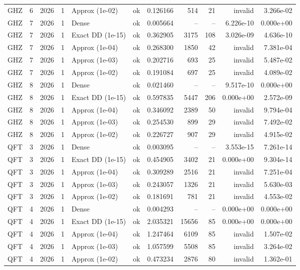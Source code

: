 \begin{tabular}{lrrrllrrrrr}
GHZ & 6 & 2026 & 1 & Approx (1e-02) & ok & 0.126166 & 514 & 21 & invalid & 3.266e-02 \\
GHZ & 7 & 2026 & 1 & Dense & ok & 0.005664 & -- & -- & 6.226e-10 & 0.000e+00 \\
GHZ & 7 & 2026 & 1 & Exact DD (1e-15) & ok & 0.362905 & 3175 & 108 & 3.026e-09 & 4.636e-10 \\
GHZ & 7 & 2026 & 1 & Approx (1e-04) & ok & 0.268300 & 1850 & 42 & invalid & 7.381e-04 \\
GHZ & 7 & 2026 & 1 & Approx (1e-03) & ok & 0.202716 & 693 & 25 & invalid & 5.487e-02 \\
GHZ & 7 & 2026 & 1 & Approx (1e-02) & ok & 0.191084 & 697 & 25 & invalid & 4.089e-02 \\
GHZ & 8 & 2026 & 1 & Dense & ok & 0.021460 & -- & -- & 9.517e-10 & 0.000e+00 \\
GHZ & 8 & 2026 & 1 & Exact DD (1e-15) & ok & 0.597835 & 5447 & 206 & 0.000e+00 & 2.572e-09 \\
GHZ & 8 & 2026 & 1 & Approx (1e-04) & ok & 0.346092 & 2389 & 50 & invalid & 9.794e-04 \\
GHZ & 8 & 2026 & 1 & Approx (1e-03) & ok & 0.254530 & 899 & 29 & invalid & 7.492e-02 \\
GHZ & 8 & 2026 & 1 & Approx (1e-02) & ok & 0.226727 & 907 & 29 & invalid & 4.915e-02 \\
QFT & 3 & 2026 & 1 & Dense & ok & 0.003095 & -- & -- & 3.553e-15 & 7.261e-14 \\
QFT & 3 & 2026 & 1 & Exact DD (1e-15) & ok & 0.454905 & 3402 & 21 & 0.000e+00 & 9.304e-14 \\
QFT & 3 & 2026 & 1 & Approx (1e-04) & ok & 0.309289 & 2516 & 21 & invalid & 7.251e-04 \\
QFT & 3 & 2026 & 1 & Approx (1e-03) & ok & 0.243057 & 1326 & 21 & invalid & 5.630e-03 \\
QFT & 3 & 2026 & 1 & Approx (1e-02) & ok & 0.181691 & 781 & 21 & invalid & 4.553e-02 \\
QFT & 4 & 2026 & 1 & Dense & ok & 0.004293 & -- & -- & 0.000e+00 & 0.000e+00 \\
QFT & 4 & 2026 & 1 & Exact DD (1e-15) & ok & 2.035321 & 15656 & 85 & 0.000e+00 & 0.000e+00 \\
QFT & 4 & 2026 & 1 & Approx (1e-04) & ok & 1.247464 & 6109 & 85 & invalid & 1.507e-02 \\
QFT & 4 & 2026 & 1 & Approx (1e-03) & ok & 1.057599 & 5508 & 85 & invalid & 3.264e-02 \\
QFT & 4 & 2026 & 1 & Approx (1e-02) & ok & 0.473234 & 2876 & 80 & invalid & 1.362e-01 \\

\end{tabular}
